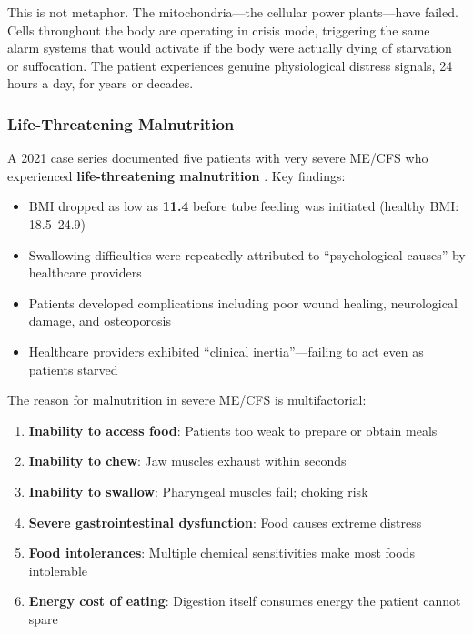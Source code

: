 This is not metaphor. The mitochondria---the cellular power plants---have failed. Cells throughout the body are operating in crisis mode, triggering the same alarm systems that would activate if the body were actually dying of starvation or suffocation. The patient experiences genuine physiological distress signals, 24 hours a day, for years or decades.

\subsubsection{Life-Threatening Malnutrition}
\label{subsec:malnutrition}

A 2021 case series documented five patients with very severe ME/CFS who experienced \textbf{life-threatening malnutrition} \cite{Baxter2021malnutrition}. Key findings:

\begin{itemize}
    \item BMI dropped as low as \textbf{11.4} before tube feeding was initiated (healthy BMI: 18.5--24.9)
    \item Swallowing difficulties were repeatedly attributed to ``psychological causes'' by healthcare providers
    \item Patients developed complications including poor wound healing, neurological damage, and osteoporosis
    \item Healthcare providers exhibited ``clinical inertia''---failing to act even as patients starved
\end{itemize}

The reason for malnutrition in severe ME/CFS is multifactorial:

\begin{enumerate}
    \item \textbf{Inability to access food}: Patients too weak to prepare or obtain meals
    \item \textbf{Inability to chew}: Jaw muscles exhaust within seconds
    \item \textbf{Inability to swallow}: Pharyngeal muscles fail; choking risk
    \item \textbf{Severe gastrointestinal dysfunction}: Food causes extreme distress
    \item \textbf{Food intolerances}: Multiple chemical sensitivities make most foods intolerable
    \item \textbf{Energy cost of eating}: Digestion itself consumes energy the patient cannot spare
\end{enumerate}

